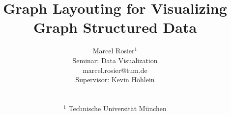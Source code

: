 

\title[Seminar Topic]%
      {Graph Layouting for Visualizing Graph Structured Data}

\author[M.Rosier \& K.\"ohlein]
{\parbox{\textwidth}{\centering Marcel Rosier$^1$%
\\ Seminar: Data Visualization %
\\ marcel.rosier@tum.de%
\\ Supervisor: Kevin H\"ohlein%
        }
        \\
{\parbox{\textwidth}{\centering $^1$ Technische Universit\"at M\"unchen
       }
}
}

%





